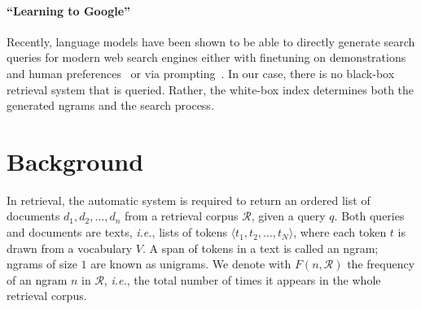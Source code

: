 \documentclass[11pt]{article}
\newcommand{\ie}{\textit{i.e.}}
\begin{document}
\paragraph{``Learning to Google''}
Recently, language models have been shown to be able to directly generate search queries for modern web search engines either with finetuning on demonstrations~\citep{Komeili2021InternetAugmentedDG,Shuster2022LanguageMT} and human preferences~\citep{nakano-2021-webgpt} or via prompting~\citep{lazaridou-etal-2022-internet}. In our case, there is no black-box retrieval system that is queried. Rather, the white-box index determines both the generated ngrams and the search process.

\section{Background}

In retrieval, the automatic system is required to return an ordered list of documents $d_1, d_2, \dots, d_n$ from a retrieval corpus $\mathcal{R}$, given a query $q$. Both queries and documents are texts, \ie, lists of tokens $\langle t_1, t_2, \dots, t_N\rangle$, where each token $t$ is drawn from a vocabulary $V$. A span of tokens in a text is called an ngram; ngrams of size $1$ are known as unigrams. We denote with $F(n, \mathcal{R})$ the frequency of an ngram $n$ in $\mathcal{R}$, \ie, the total number of times it appears in the whole retrieval corpus.
\end{document}
